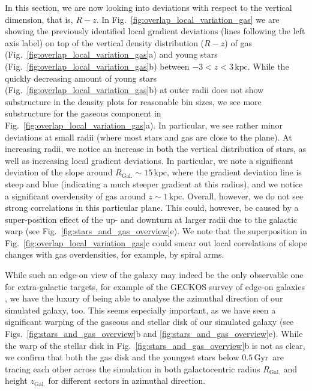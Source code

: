 \documentclass[fleqn,usenatbib]{mnras}
\newcommand{\nihaoAGEmax}{$0.5\,\mathrm{Gyr}$}
\begin{document}
In this section, we are now looking into deviations with respect to the vertical dimension, that is, $R-z$. In Fig.~\ref{fig:overlap_local_variation_gas} we are showing the previously identified local gradient deviations (lines following the left axis label) on top of the vertical density distribution ($R-z$) of gas (Fig.~\ref{fig:overlap_local_variation_gas}a) and young stars (Fig.~\ref{fig:overlap_local_variation_gas}b) between $-3 < z < 3\,\mathrm{kpc}$. While the quickly decreasing amount of young stars (Fig.~\ref{fig:overlap_local_variation_gas}b) at outer radii does not show substructure in the density plots for reasonable bin sizes, we see more substructure for the gaseous component in Fig.~\ref{fig:overlap_local_variation_gas}a). In particular, we see rather minor deviations at small radii (where most stars and gas are close to the plane). At increasing radii, we notice an increase in both the vertical distribution of stars, as well as increasing local gradient deviations. In particular, we note a significant deviation of the slope around $R_\mathrm{Gal.} \sim 15\,\mathrm{kpc}$, where the gradient deviation line is steep and blue (indicating a much steeper gradient at this radius), and we notice a significant overdensity of gas around $z \sim 1\,\mathrm{kpc}$. Overall, however, we do not see strong correlations in this particular plane. This could, however, be caused by a super-position effect of the up- and downturn at larger radii due to the galactic warp (see Fig.~\ref{fig:stars_and_gas_overview}e). We note that the superposition in Fig.~\ref{fig:overlap_local_variation_gas}c could smear out local correlations of slope changes with gas overdensities, for example, by spiral arms.

While such an edge-on view of the galaxy may indeed be the only observable one for extra-galactic targets, for example of the GECKOS survey of edge-on galaxies \citep{GECKOS2023}, we have the luxury of being able to analyse the azimuthal direction of our simulated galaxy, too. This seems especially important, as we have seen a significant warping of the gaseous and stellar disk of our simulated galaxy (see Figs.~\ref{fig:stars_and_gas_overview}b and \ref{fig:stars_and_gas_overview}e). While the warp of the stellar disk in Fig.~\ref{fig:stars_and_gas_overview}b is not as clear, we confirm that both the gas disk and the youngest stars below \nihaoAGEmax\ are tracing each other across the simulation in both galactocentric radius $R_\mathrm{Gal.}$ and height $z_\mathrm{Gal.}$ for different sectors in azimuthal direction.
\end{document}
